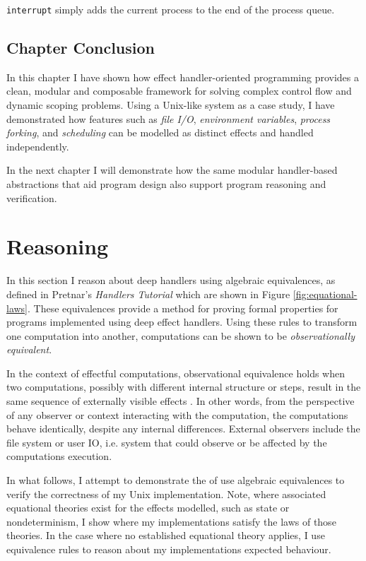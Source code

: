 \documentclass[logo,bsc,singlespacing,parskip]{infthesis}
\begin{document}
\lstinline{interrupt} simply adds the current process to the end of the process queue.

\section{Chapter Conclusion}

In this chapter I have shown how effect handler-oriented programming provides a clean, modular and composable framework for solving complex control flow and dynamic scoping problems. Using a Unix-like system as a case study, I have demonstrated how features such as \textit{file I/O}, \textit{environment variables}, \textit{process forking}, and \textit{scheduling} can be modelled as distinct effects and handled independently. 


In the next chapter I will demonstrate how the same modular handler-based abstractions that aid program design also support program reasoning and verification.




\chapter{Reasoning}

In this section I reason about deep handlers using algebraic equivalences, as defined in Pretnar's \textit{Handlers Tutorial} \cite{pretnar_introduction_2015} which are shown in Figure \ref{fig:equational-laws}.  These equivalences provide a method for proving formal properties for programs implemented using deep effect handlers. Using these rules to transform one computation into another, computations can be shown to be \textit{observationally equivalent}.

In the context of effectful computations, observational equivalence holds when two computations, possibly with different internal structure or steps, result in the same sequence of externally visible effects \cite{sannella1987observational}. In other words, from the perspective of any observer or context interacting with the computation, the computations behave identically, despite any internal differences. External observers include the file system or user IO, i.e. system that could observe or be affected by the computations execution.



In what follows, I attempt to demonstrate the of use algebraic equivalences to verify the correctness of my Unix implementation. Note, where associated equational theories exist for the effects modelled, such as state or nondeterminism, I show where my implementations satisfy the laws of those theories. In the case where no established equational theory applies, I use equivalence rules to reason about my implementations expected behaviour.
\end{document}
